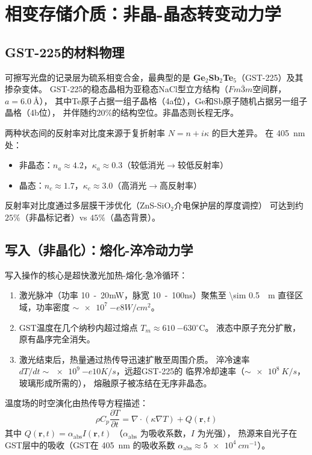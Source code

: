 \documentclass[11pt,a4paper,twoside]{article}
\newcommand{\degC}{\ensuremath{{}^{\circ}\mathrm{C}}}
\theoremstyle{definition}\newtheorem{definition}{定义}[section]
\theoremstyle{plain}\newtheorem{theorem}{定理}[section]
\theoremstyle{remark}\newtheorem{remark}{注解}[section]
\begin{document}
\section{相变存储介质：非晶-晶态转变动力学}
\label{sec:pcm}

\subsection{GST-225的材料物理}

可擦写光盘的记录层为硫系相变合金，最典型的是
\textbf{Ge$_2$Sb$_2$Te$_5$}（GST-225）及其掺杂变体。
GST-225的稳态晶相为亚稳态NaCl型立方结构（$Fm\bar{3}m$空间群，$a=\SI{6.0}{\angstrom}$），
其中Te原子占据一组子晶格（4a位），Ge和Sb原子随机占据另一组子晶格（4b位），
并伴随约20\%的结构空位。非晶态则长程无序。

两种状态间的反射率对比度来源于复折射率 $N = n + i\kappa$ 的巨大差异。
在 \SI{405}{nm} 处：
\begin{itemize}
  \item 非晶态：$n_a \approx 4.2$，$\kappa_a \approx 0.3$（较低消光$\to$较低反射率）
  \item 晶态：$n_c \approx 1.7$，$\kappa_c \approx 3.0$（高消光$\to$高反射率）
\end{itemize}
反射率对比度通过多层膜干涉优化（ZnS-SiO$_2$介电保护层的厚度调控）
可达到约 $25\%$（非晶标记者）vs $45\%$（晶态背景）。

\subsection{写入（非晶化）：熔化-淬冷动力学}

写入操作的核心是超快激光加热-熔化-急冷循环：
\begin{enumerate}
  \item 激光脉冲（功率 \SI{10}{-20}{mW}，脉宽 \SI{10}{-100}{ns}）聚焦至
  \SI{\sim 0.5}{\mu m} 直径区域，功率密度 $\sim \SI{e7}{-e8}{W/cm^2}$。
  \item GST温度在几个纳秒内超过熔点 $T_m \approx \SI{610}{-630}{\degC{}}$。
  液态中原子充分扩散，原有晶序完全消失。
  \item 激光结束后，热量通过热传导迅速扩散至周围介质。
  淬冷速率 $dT/dt \sim \SI{e9}{-e10}{K/s}$，远超GST-225的
  临界冷却速率（$\sim \SI{e8}{K/s}$，玻璃形成所需的），
  熔融原子被冻结在无序非晶态。
\end{enumerate}

温度场的时空演化由热传导方程描述：
\begin{equation}\label{eq:heat-pcm}
  \rho C_p \frac{\partial T}{\partial t}
  = \nabla \cdot (\kappa \nabla T) + Q(\mathbf{r}, t)
\end{equation}
其中 $Q(\mathbf{r}, t) = \alpha_{\text{abs}} I(\mathbf{r}, t)$
（$\alpha_{\text{abs}}$ 为吸收系数，$I$ 为光强），
热源来自光子在GST层中的吸收（GST在 \SI{405}{nm} 的吸收系数
$\alpha_{\text{abs}} \approx \SI{5e4}{cm^{-1}}$）。
\end{document}
